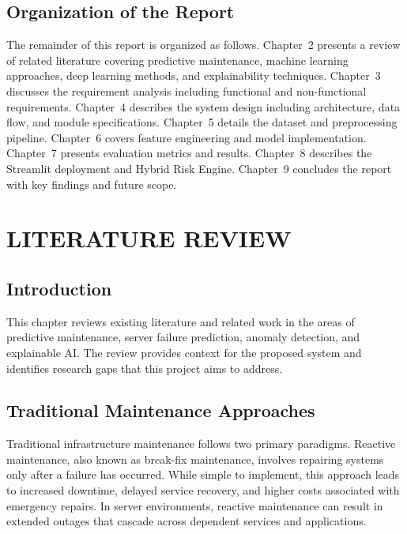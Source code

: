 \documentclass[12pt,letterpaper]{report}
\begin{document}
\section{Organization of the Report}

The remainder of this report is organized as follows. Chapter~2 presents a review of related literature covering predictive maintenance, machine learning approaches, deep learning methods, and explainability techniques. Chapter~3 discusses the requirement analysis including functional and non-functional requirements. Chapter~4 describes the system design including architecture, data flow, and module specifications. Chapter~5 details the dataset and preprocessing pipeline. Chapter~6 covers feature engineering and model implementation. Chapter~7 presents evaluation metrics and results. Chapter~8 describes the Streamlit deployment and Hybrid Risk Engine. Chapter~9 concludes the report with key findings and future scope.


\chapter{LITERATURE REVIEW}

\section{Introduction}

This chapter reviews existing literature and related work in the areas of predictive maintenance, server failure prediction, anomaly detection, and explainable AI. The review provides context for the proposed system and identifies research gaps that this project aims to address.

\section{Traditional Maintenance Approaches}

Traditional infrastructure maintenance follows two primary paradigms. Reactive maintenance, also known as break-fix maintenance, involves repairing systems only after a failure has occurred. While simple to implement, this approach leads to increased downtime, delayed service recovery, and higher costs associated with emergency repairs. In server environments, reactive maintenance can result in extended outages that cascade across dependent services and applications.
\end{document}
